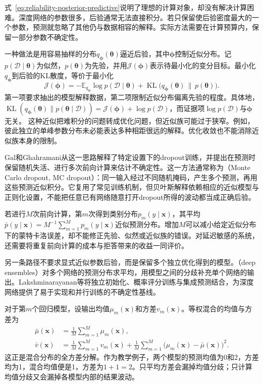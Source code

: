 式~\eqref{eq:reliability-posterior-predictive}说明了理想的计算对象，却没有解决计算困难。深度网络的参数很多，后验通常无法直接积分。若只保留使后验密度最大的一个参数，预测就忽略了其他仍与数据相容的解释。实际方法需要在计算预算内，保留一部分参数不确定性。

一种做法是用容易抽样的分布$q_{\bm{\phi}}(\bm{\theta})$逼近后验，其中$\bm{\phi}$控制近似分布。记$p(\mathcal D\mid\bm{\theta})$为似然，$p(\bm{\theta})$为先验，并用$\mathcal J(\bm{\phi})$表示待最小化的变分目标。最小化$q_{\bm{\phi}}$到后验的KL散度，等价于最小化
\begin{equation}
 \mathcal J(\bm{\phi})
 =-\mathbb E_{q_{\bm{\phi}}}\log p(\mathcal D\mid\bm{\theta})
   +\operatorname{KL}\bigl(q_{\bm{\phi}}(\bm{\theta})
                    \,\|\,p(\bm{\theta})\bigr).
 \label{eq:reliability-variational-objective}
\end{equation}
第一项要求抽出的模型解释数据，第二项限制近似分布偏离先验的程度。具体地，
$\operatorname{KL}(q_{\bm{\phi}}(\bm{\theta})\|p(\bm{\theta}\mid\mathcal D))
=\mathcal J(\bm{\phi})+\log p(\mathcal D)$，而证据项$\log p(\mathcal D)$与$\bm{\phi}$无关。
这种近似把难积分的问题转成优化问题，但近似族可能过于狭窄。例如，彼此独立的单峰参数分布未必能表达多种相距很远的解释。优化收敛也不能消除近似族本身的限制。

Gal和Ghahramani从这一思路解释了特定设置下的dropout训练，并提出在预测时保留随机失活、进行多次前向计算来估计不确定性。这一方法通常称为（Monte Carlo dropout, MC dropout）：同一输入经过不同随机掩码，产生多个预测，再用这些预测近似积分。它复用了常见训练机制，但贝叶斯解释依赖相应的近似模型与正则化设置，不能把任意已有网络随意打开dropout所得的波动都当成正确后验。

若进行$M$次前向计算，第$m$次得到类别分布$p_m(y\mid\bm{x})$，其平均$\bar p(y\mid\bm{x})=M^{-1}\sum_{m=1}^{M}p_m(y\mid\bm{x})$近似预测分布。增加$M$可以减小给定近似分布下的蒙特卡洛误差，却不能修正先验、似然或近似族的错误。对延迟敏感的系统，还需要将重复前向计算的成本与拒答带来的收益一同评价。

另一条路径不要求显式近似参数后验，而是保留多个独立优化得到的模型。（deep ensembles）对多个网络的预测分布求平均，用模型之间的分歧补充单个网络的输出。Lakshminarayanan等将独立初始化、概率评分训练与集成预测结合，为深度网络提供了易于实现和并行训练的不确定性基线。

对于第$m$个回归模型，设输出均值$\mu_m(\bm{x})$和方差$v_m(\bm{x})$。等权混合的均值与方差为
\begin{equation}
 \begin{aligned}
 \bar\mu(\bm{x})&=\frac1M\sum_{m=1}^{M}\mu_m(\bm{x}),\\
 \bar v(\bm{x})&=\frac1M\sum_{m=1}^{M}v_m(\bm{x})
  +\frac1M\sum_{m=1}^{M}
       \bigl(\mu_m(\bm{x})-\bar\mu(\bm{x})\bigr)^2.
 \end{aligned}
 \label{eq:reliability-ensemble-variance}
\end{equation}
这正是混合分布的全方差分解。作为教学例子，两个模型的预测均值为0和2，方差均为1，混合均值便是1，方差为$1+1=2$。只平均方差会漏掉均值分歧；只计算均值分歧又会漏掉各模型内部的结果波动。

